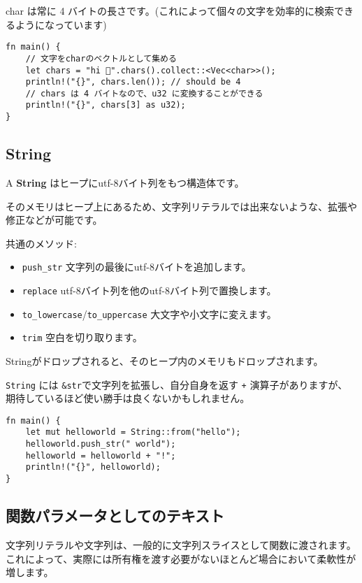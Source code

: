 char は常に 4
バイトの長さです。(これによって個々の文字を効率的に検索できるようになっています)

\begin{verbatim}
fn main() {
    // 文字をcharのベクトルとして集める
    let chars = "hi 🦀".chars().collect::<Vec<char>>();
    println!("{}", chars.len()); // should be 4
    // chars は 4 バイトなので、u32 に変換することができる
    println!("{}", chars[3] as u32);
}
\end{verbatim}

\subsection{String}

A \textbf{String} はヒープにutf-8バイト列をもつ構造体です。

そのメモリはヒープ上にあるため、文字列リテラルでは出来ないような、拡張や修正などが可能です。

共通のメソッド:

\begin{itemize}
\item
  \texttt{push\_str} 文字列の最後にutf-8バイトを追加します。
\item
  \texttt{replace} utf-8バイト列を他のutf-8バイト列で置換します。
\item
  \texttt{to\_lowercase}/\texttt{to\_uppercase}
  大文字や小文字に変えます。
\item
  \texttt{trim} 空白を切り取ります。
\end{itemize}

Stringがドロップされると、そのヒープ内のメモリもドロップされます。

\texttt{String} には \texttt{\&str}で文字列を拡張し、自分自身を返す
\texttt{+} 演算子がありますが、
期待しているほど使い勝手は良くないかもしれません。

\begin{verbatim}
fn main() {
    let mut helloworld = String::from("hello");
    helloworld.push_str(" world");
    helloworld = helloworld + "!";
    println!("{}", helloworld);
}
\end{verbatim}

\subsection{関数パラメータとしてのテキスト}

文字列リテラルや文字列は、一般的に文字列スライスとして関数に渡されます。
これによって、実際には所有権を渡す必要がないほとんど場合において柔軟性が増します。

